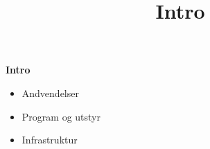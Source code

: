 \documentclass{article}
\title{Intro}
\begin{document}
    \begin{flushleft}
        \textbf{Intro} 
        \begin{itemize}
            \item Andvendelser
            \item Program og utstyr
            \item Infrastruktur
        \end{itemize}
        
    \end{flushleft}
\end{document}
